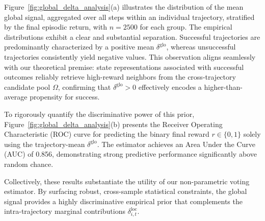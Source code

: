 Figure~\ref{fig:global_delta_analysis}(a) illustrates the distribution of the
mean global signal, aggregated over all steps within an individual trajectory,
stratified by the final episodic return, with \(n=2500\) for each group.
The empirical distributions exhibit a clear and substantial separation.
Successful trajectories are predominantly characterized by a positive mean
\(\delta^{\mathrm{glo}}\), whereas unsuccessful trajectories consistently
yield negative values.
This observation aligns seamlessly with our theoretical premise: state
representations associated with successful outcomes reliably retrieve
high-reward neighbors from the cross-trajectory candidate pool \(\Omega\),
confirming that \(\delta^{\mathrm{glo}} > 0\) effectively encodes a
higher-than-average propensity for success.

To rigorously quantify the discriminative power of this prior,
Figure~\ref{fig:global_delta_analysis}(b) presents the Receiver Operating
Characteristic (ROC) curve for predicting the binary final reward
\(r \in \{0, 1\}\) solely using the trajectory-mean \(\delta^{\mathrm{glo}}\).
The estimator achieves an Area Under the Curve (AUC) of 0.856, demonstrating
strong predictive performance significantly above random chance.

Collectively, these results substantiate the utility of our non-parametric
voting estimator.
By surfacing robust, cross-sample statistical constraints, the global signal
provides a highly discriminative empirical prior that complements the
intra-trajectory marginal contributions \(\delta_{i,t}^{\mathrm{loc}}\).